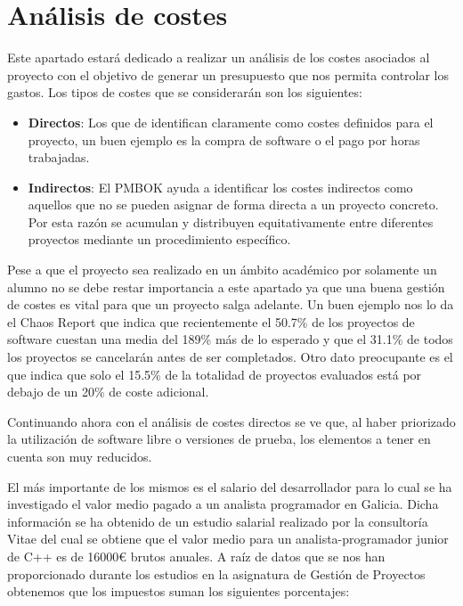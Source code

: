 \section{Análisis de costes}

Este apartado estará dedicado a realizar un análisis de los costes asociados al proyecto con el objetivo de generar un presupuesto que nos permita controlar los gastos. Los tipos de costes que se considerarán son los siguientes:

\begin{itemize}
	\item \textbf{Directos}: Los que de identifican claramente como costes definidos para el proyecto, un buen ejemplo es la compra de software o el pago por horas trabajadas.
	\item \textbf{Indirectos}: El PMBOK\cite{pmbok} ayuda a identificar los costes indirectos como aquellos que no se pueden asignar de forma directa a un proyecto concreto. Por esta razón se acumulan y distribuyen equitativamente entre diferentes proyectos mediante un procedimiento específico.
\end{itemize}

Pese a que el proyecto sea realizado en un ámbito académico por solamente un alumno no se debe restar importancia a este apartado ya que una buena gestión de costes es vital para que un proyecto salga adelante. Un buen ejemplo nos lo da el Chaos Report\cite{chaos} que indica que recientemente el 50.7\% de los proyectos de software cuestan una media del 189\% más de lo esperado y que el 31.1\% de todos los proyectos se cancelarán antes de ser completados. Otro dato preocupante es el que indica que solo el 15.5\% de la totalidad de proyectos evaluados está por debajo de un 20\% de coste adicional.

\bigskip

Continuando ahora con el análisis de costes directos se ve que, al haber priorizado la utilización de software libre o versiones de prueba, los elementos a tener en cuenta son muy reducidos.

\bigskip 

El más importante de los mismos es el salario del desarrollador para lo cual se ha investigado el valor medio pagado a un analista programador en Galicia. Dicha información se ha obtenido de un estudio salarial realizado por la consultoría Vitae\cite{vitae}  del cual se obtiene que el valor medio para un analista-programador junior de C++ es de 16000\euro{} brutos anuales. A raíz de datos que se nos han proporcionado durante los estudios en la asignatura de Gestión de Proyectos obtenemos que los impuestos suman los siguientes porcentajes: 

